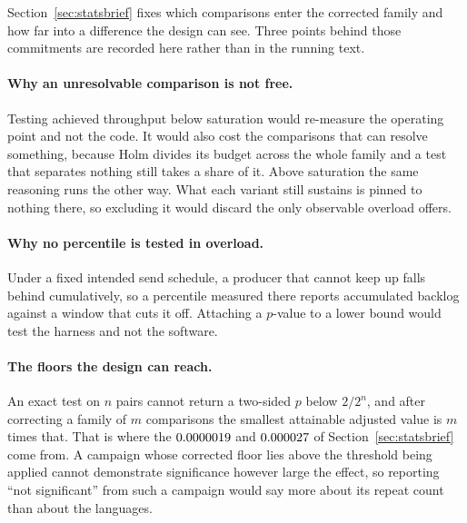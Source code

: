\documentclass[english,oneside,a4paper,censored,csm,software-track-2020]{HYthesisML}
\begin{document}
\begin{appendices}
Section~\ref{sec:statsbrief} fixes which comparisons enter the corrected family and how far into a
difference the design can see. Three points behind those commitments are recorded here rather
than in the running text.

\paragraph{Why an unresolvable comparison is not free.}
Testing achieved throughput below saturation would re-measure the operating point and not the
code. It would also cost the comparisons that can resolve something, because Holm divides its
budget across the whole family and a test that separates nothing still takes a share of it. Above
saturation the same reasoning runs the other way. What each variant still sustains is pinned to
nothing there, so excluding it would discard the only observable overload offers.

\paragraph{Why no percentile is tested in overload.}
Under a fixed intended send schedule, a producer that cannot keep up falls behind cumulatively, so
a percentile measured there reports accumulated backlog against a window that cuts it off.
Attaching a $p$-value to a lower bound would test the harness and not the software.

\paragraph{The floors the design can reach.}
An exact test on $n$ pairs cannot return a two-sided $p$ below $2/2^{n}$, and after correcting a
family of $m$ comparisons the smallest attainable adjusted value is $m$ times that. That is where
the $0.0000019$ and $0.000027$ of Section~\ref{sec:statsbrief} come from. A campaign whose
corrected floor lies above the threshold being applied cannot demonstrate significance however
large the effect, so reporting ``not significant'' from such a campaign would say more about its
repeat count than about the languages.


\end{appendices}
\end{document}
